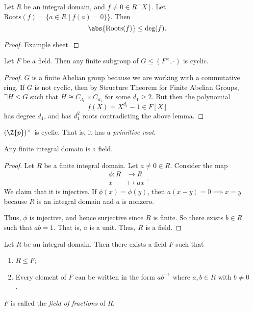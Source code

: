 \leavevmode
\begin{lemma}{}{}
    Let \(R\) be an integral domain, and \(f \neq 0 \in R[X]\). Let \(\mathrm{Roots}(f)=\{a\in R \mid f(a) = 0\}\}\). Then
    \[
        \abs{\mathrm{Roots}(f)} \leq \deg(f).
    \]
\end{lemma}
\begin{proof}
    Example sheet.
\end{proof}
\begin{theorem}{}{}
    Let \(F\) be a field. Then any finite subgroup of \(G \leq (F^\times, \cdot)\) is cyclic.
\end{theorem}
\begin{proof}
    \(G\) is a finite Abelian group because we are working with a commutative ring. If \(G\) is not cyclic, then by Structure Theorem for Finite Abelian Groups, \(\exists H \leq G\) such that \(H \cong C_{d_1}\times C_{d_1}\) for some \(d_1 \geq 2\). But then the polynomial
    \[
        f(X) = X^{d_1} - 1 \in F[X]
    \]
    has degree \(d_1\), and has \(d_1^2\) roots contradicting the above lemma.
\end{proof}
\begin{example}
    \((\Z{p})^\times \) is cyclic. That is, it has a \textit{primitive root}.
\end{example}
\begin{proposition}{}{}
    Any finite integral domain is a field.
\end{proposition}
\begin{proof}
    Let \(R\) be a finite integral domain. Let \(a \neq 0 \in R\). Consider the map
    \[
    \begin{aligned}
      \phi\colon R & \longrightarrow R      \\
      x          & \longmapsto ax
    \end{aligned}.
    \]
    We claim that it is injective. If \(\phi(x) = \phi(y)\), then \(a(x-y) = 0 \implies x = y\) because \(R\) is an integral domain and \(a\) is nonzero.

    Thus, \(\phi\) is injective, and hence surjective since \(R\) is finite. So there exists \(b \in R\) such that \(ab = 1\). That is, \(a\) is a unit. Thus, \(R\) is a field.
\end{proof}
\begin{theorem}{}{}
    Let \(R\) be an integral domain. Then there exists a field \(F\) such that
    \begin{enumerate}
        \item \(R \leq F\);
        \item Every element of \(F\) can be written in the form \(a b^{-1}\) where \(a,b \in R\) with \(b \neq 0\).
    \end{enumerate}

    \(F\) is called the \textit{field of fractions} of \(R\).
\end{theorem}
